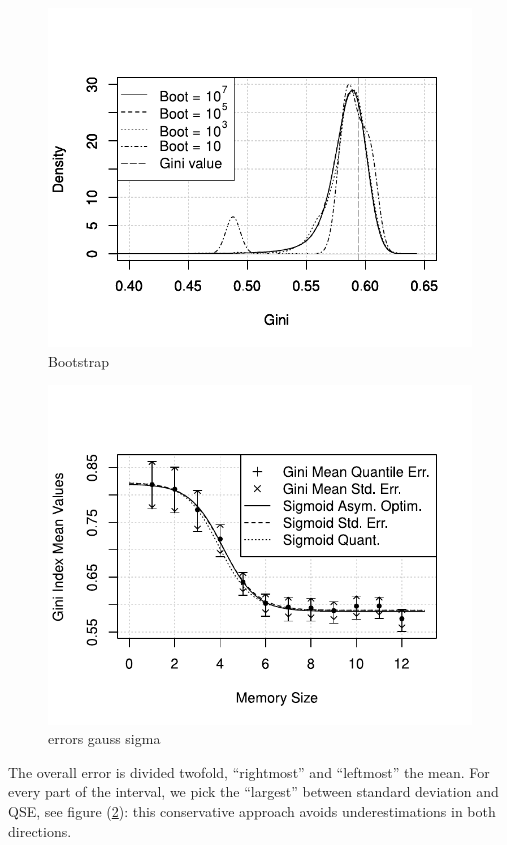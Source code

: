 \begin{figure}[htpb]
  \centering
  \includegraphics[width=.8\columnwidth]{img/bootstrap.pdf}
  \caption{Bootstrap}
  \label{fig:bootstrap}
\end{figure}
\begin{figure}[htpb]
  \centering
  \includegraphics[width=.8\columnwidth]{img/appendix.pdf}
  \caption{errors gauss sigma}
  \label{fig:gauss_sigma}
\end{figure}
The overall error is divided twofold, ``rightmost'' and ``leftmost''
the mean. For every part of the interval, we pick the ``largest''
between standard deviation and QSE, see figure (\ref{fig:gauss_sigma}): this conservative approach avoids
underestimations in both directions.

